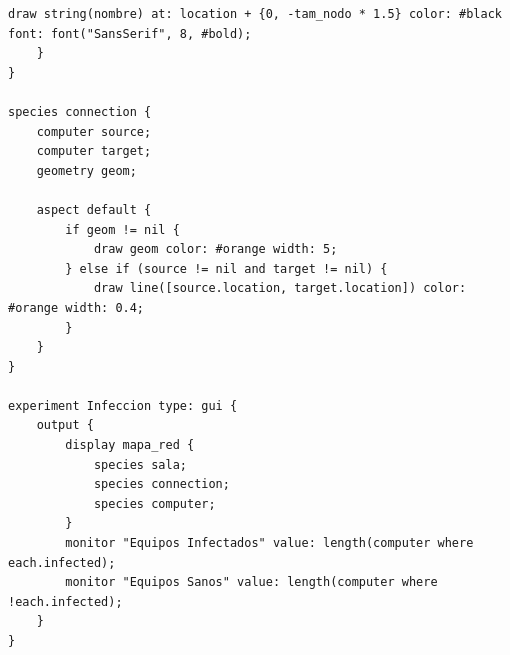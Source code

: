 \documentclass{ieeeaccess}
\begin{document}
\begin{lstlisting}[caption={InfeccionRedes.gaml - Código fuente de la simulación en GAMA Platform}, label={list:gaml_code}]
        draw string(nombre) at: location + {0, -tam_nodo * 1.5} color: #black font: font("SansSerif", 8, #bold);
    }
}

species connection {
    computer source;
    computer target;
    geometry geom;
    
    aspect default {
        if geom != nil {
            draw geom color: #orange width: 5;
        } else if (source != nil and target != nil) {
            draw line([source.location, target.location]) color: #orange width: 0.4;
        }
    }
}

experiment Infeccion type: gui {
    output {
        display mapa_red {
            species sala;
            species connection;
            species computer;
        }
        monitor "Equipos Infectados" value: length(computer where each.infected);
        monitor "Equipos Sanos" value: length(computer where !each.infected);
    }
}
\end{lstlisting}

\EOD
\end{document}
